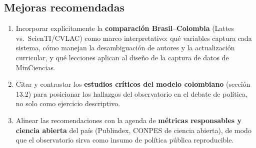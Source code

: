 \subsection{Mejoras recomendadas}

\begin{enumerate}
  \item Incorporar explícitamente la \textbf{comparación Brasil--Colombia}
        (Lattes vs.\ ScienTI/CVLAC) como marco interpretativo: qué variables
        captura cada sistema, cómo manejan la desambiguación de autores y la
        actualización curricular, y qué lecciones aplican al diseño de la
        captura de datos de MinCiencias.
  \item Citar y contrastar los \textbf{estudios críticos del modelo colombiano}
        (sección 13.2) para posicionar los hallazgos del observatorio en el
        debate de política, no solo como ejercicio descriptivo.
  \item Alinear las recomendaciones con la agenda de \textbf{métricas
        responsables y ciencia abierta} del país (Publindex, CONPES de ciencia
        abierta), de modo que el observatorio sirva como insumo de política
        pública reproducible.
\end{enumerate}
